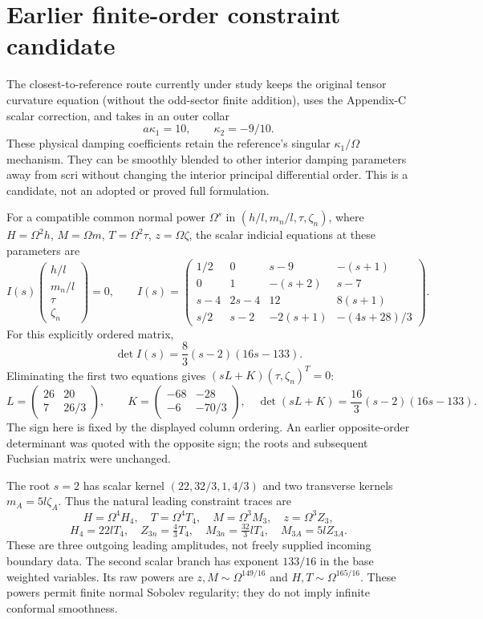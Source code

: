 \documentclass[11pt]{article}
\begin{document}
\section{Earlier finite-order constraint candidate}
The closest-to-reference route currently under study keeps the original
tensor curvature equation (without the odd-sector finite addition), uses
the Appendix-C scalar correction, and takes in an outer collar
\[
\boxed{a\kappa_1=10,\qquad\kappa_2=-9/10.}
\]
These physical damping coefficients retain the reference's singular
$\kappa_1/\Omega$ mechanism. They can be smoothly blended to other
interior damping parameters away from scri without changing the interior
principal differential order. This is a candidate, not an adopted or
proved full formulation.

For a compatible common normal power $\Omega^s$ in
$(h/l,m_n/l,\tau,\zeta_n)$, where $H=\Omega^2h$,
$M=\Omega m$, $T=\Omega^2\tau$, $z=\Omega\zeta$, the scalar
indicial equations at these parameters are
\[
I(s)\begin{pmatrix}h/l\\m_n/l\\\tau\\\zeta_n\end{pmatrix}=0,\qquad
I(s)=
\begin{pmatrix}
1/2&0&s-9&-(s+1)\\
0&1&-(s+2)&s-7\\
s-4&2s-4&12&8(s+1)\\
s/2&s-2&-2(s+1)&-(4s+28)/3
\end{pmatrix}.
\]
For this explicitly ordered matrix,
\[
\det I(s)=\frac83(s-2)(16s-133).
\]
Eliminating the first two equations gives $(sL+K)(\tau,\zeta_n)^T=0$:
\[
L=\begin{pmatrix}26&20\\7&26/3\end{pmatrix},\qquad
K=\begin{pmatrix}-68&-28\\-6&-70/3\end{pmatrix},
\quad
\det(sL+K)=\frac{16}{3}(s-2)(16s-133).
\]
The sign here is fixed by the displayed column ordering. An earlier
opposite-order determinant was quoted with the opposite sign; the roots
and subsequent Fuchsian matrix were unchanged.

The root $s=2$ has scalar kernel
$(22,32/3,1,4/3)$ and two transverse kernels
$m_A=5l\zeta_A$. Thus the natural leading constraint traces are
\[
H=\Omega^4H_4,\quad T=\Omega^4T_4,\quad
M=\Omega^3M_3,\quad z=\Omega^3Z_3,
\]
\[
\boxed{
H_4=22lT_4,\quad Z_{3n}=\tfrac43T_4,\quad
M_{3n}=\tfrac{32}{3}lT_4,\quad M_{3A}=5lZ_{3A}.
}
\]
These are three outgoing leading amplitudes, not freely supplied
incoming boundary data. The second scalar branch has exponent $133/16$
in the base weighted variables. Its raw powers are
$z,M\sim\Omega^{149/16}$ and $H,T\sim\Omega^{165/16}$.
These powers permit finite normal Sobolev regularity; they do not imply
infinite conformal smoothness.
\end{document}
